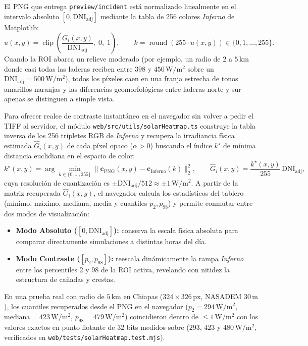 \documentclass[11pt,a4paper]{article}
\newcommand{\src}[1]{\nolinkurl{#1}}
\newcommand{\unit}[1]{\mathrm{#1}}
\begin{document}
\begin{ejemplo}
El PNG que entrega \texttt{preview/incident} está normalizado linealmente en el intervalo absoluto
$[0, \mathrm{DNI}_{\mathrm{adj}}]$ mediante la tabla de 256 colores \emph{Inferno} de Matplotlib:
\begin{equation}
  u(x,y) = \operatorname{clip}\!\left(\frac{G_i(x,y)}{\mathrm{DNI}_{\mathrm{adj}}},\; 0,\; 1\right),
  \qquad
  k = \operatorname{round}(255 \cdot u(x,y)) \in \{0, 1, \ldots, 255\}.
  \label{eq:solar-lut-forward}
\end{equation}
Cuando la ROI abarca un relieve moderado (por ejemplo, un radio de $2$ a $5\,\unit{km}$ donde casi todas las
laderas reciben entre $398$ y $450\,\unit{W/m^2}$ sobre un $\mathrm{DNI}_{\mathrm{adj}} = 500\,\unit{W/m^2}$),
todos los píxeles caen en una franja estrecha de tonos amarillos-naranjas y las diferencias geomorfológicas entre
laderas norte y sur apenas se distinguen a simple vista.

Para ofrecer realce de contraste instantáneo en el navegador sin volver a pedir el TIFF al servidor, el módulo
\src{web/src/utils/solarHeatmap.ts} construye la tabla inversa de los 256 tripletes RGB de \emph{Inferno} y
recupera la irradiancia física estimada $\hat{G}_i(x,y)$ de cada píxel opaco ($\alpha > 0$) buscando el índice
$k^\star$ de mínima distancia euclidiana en el espacio de color:
\begin{equation}
  k^\star(x,y) = \arg\min_{k\in\{0,\ldots,255\}} \bigl\|\mathbf{c}_{\mathrm{PNG}}(x,y) - \mathbf{c}_{\mathrm{Inferno}}(k)\bigr\|_2^2,
  \qquad
  \hat{G}_i(x,y) = \frac{k^\star(x,y)}{255}\,\mathrm{DNI}_{\mathrm{adj}},
  \label{eq:solar-lut-inverse}
\end{equation}
cuya resolución de cuantización es $\pm \mathrm{DNI}_{\mathrm{adj}} / 512 \approx \pm 1\,\unit{W/m^2}$. A partir
de la matriz recuperada $\hat{G}_i(x,y)$, el navegador calcula los estadísticos del tablero (mínimo, máximo,
mediana, media y cuantiles $p_2, p_{98}$) y permite conmutar entre dos modos de visualización:
\begin{itemize}
  \item \textbf{Modo Absoluto ($[0, \mathrm{DNI}_{\mathrm{adj}}]$):} conserva la escala física absoluta para
        comparar directamente simulaciones a distintas horas del día.
  \item \textbf{Modo Contraste ($[p_2, p_{98}]$):} reescala dinámicamente la rampa \emph{Inferno} entre los
        percentiles 2 y 98 de la ROI activa, revelando con nitidez la estructura de cañadas y crestas.
\end{itemize}
En una prueba real con radio de $5\,\unit{km}$ en Chiapas ($324\times 326\,\text{px}$, NASADEM $30\,\unit{m}$),
los cuantiles recuperados desde el PNG en el navegador ($p_2 = 294\,\unit{W/m^2}$, $\text{mediana} = 423\,\unit{W/m^2}$,
$p_{98} = 479\,\unit{W/m^2}$) coincidieron dentro de $\le 1\,\unit{W/m^2}$ con los valores exactos en punto
flotante de 32 bits medidos sobre  ($293$, $423$ y $480\,\unit{W/m^2}$, verificados en
\src{web/tests/solarHeatmap.test.mjs}).
\end{ejemplo}
\end{document}
